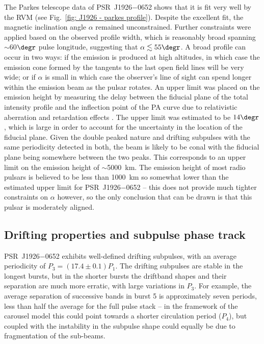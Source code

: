The Parkes telescope data of PSR~J1926$-$0652 shows that it is fit very well by the RVM (see Fig.~\ref{fig: J1926 - parkes profile}). Despite the excellent fit, the magnetic inclination angle $\alpha$ remained unconstrained. Further constraints were applied based on the observed profile width, which is reasonably broad spanning $\sim$60$\degr$ pulse longitude, suggesting that $\alpha \lesssim 55\degr$. A broad profile can occur in two ways: if the emission is produced at high altitudes, in which case the emission cone formed by the tangents to the last open field lines will be very wide; or if $\alpha$ is small in which case the observer's line of sight can spend longer within the emission beam as the pulsar rotates. An upper limit was placed on the emission height by measuring the delay between the fiducial plane of the total intensity profile and the inflection point of the PA curve due to relativistic aberration and retardation effects \citep{BCWx1991}. The upper limit was estimated to be $14\degr$, which is large in order to account for the uncertainty in the location of the fiducial plane. Given the double peaked nature and drifting subpulses with the same periodicity detected in both, the beam is likely to be conal \citep{Rxxx1983a} with the fiducial plane being somewhere between the two peaks. This corresponds to an upper limit on the emission height of $\sim$5000~km. The emission height of most radio pulsars is believed to be less than 1000~km \citep[e.g.][]{KJxx2007,JKxx2019,JSKx2020} so somewhat lower than the estimated upper limit for PSR~J1926$-$0652 -- this does not provide much tighter constraints on $\alpha$ however, so the only conclusion that can be drawn is that this pulsar is moderately aligned.






\subsection{Drifting properties and subpulse phase track}
\label{sec: J1926 - discuss - phase track}


PSR~J1926$-$0652 exhibits well-defined drifting subpulses, with an average periodicity of $P_3 = (17.4 \pm 0.1) P_1$. The drifting subpulses are stable in the longest bursts, but in the shorter bursts the driftband shapes and their separation are much more erratic, with large variations in $P_3$. For example, the average separation of successive bands in burst 5 is approximately seven periods, less than half the average for the full pulse stack -- in the framework of the carousel model this could point towards a shorter circulation period ($P_4$), but coupled with the instability in the subpulse shape could equally be due to fragmentation of the sub-beams.

